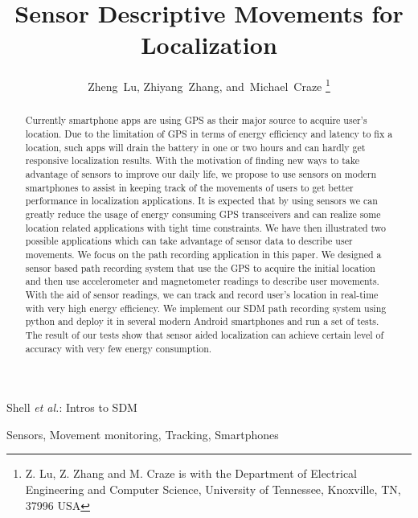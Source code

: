 \documentclass[journal]{IEEEtran}
\begin{document}
\title{Sensor Descriptive Movements for Localization}

\author{Zheng~Lu,
        Zhiyang~Zhang,
        and~Michael~Craze
\thanks{Z. Lu, Z. Zhang and M. Craze is with the Department
of Electrical Engineering and Computer Science, University of Tennessee, Knoxville,
TN, 37996 USA }} 

%
{Shell \MakeLowercase{\textit{et al.}}: Intros to SDM}


\maketitle

\begin{abstract}
Currently smartphone apps are using GPS as their major source to acquire user's location. 
Due to the limitation of GPS in terms of energy efficiency and latency to fix a location, such apps will drain the battery in one or two hours and can hardly get responsive localization results. 
With the motivation of finding new ways to take advantage of sensors to improve our daily life, we propose to use sensors on modern smartphones to assist in keeping track of the movements of users to get better performance in localization applications. 
It is expected that by using sensors we can greatly reduce the usage of energy consuming GPS transceivers and can realize some location related applications with tight time constraints. 
We have then illustrated two possible applications which can take advantage of sensor data to describe user movements.
We focus on the path recording application in this paper.
We designed a sensor based path recording system that use the GPS to acquire the initial location and then use accelerometer and magnetometer readings to describe user movements.
With the aid of sensor readings, we can track and record user's location in real-time with very high energy efficiency.
We implement our SDM path recording system using python and deploy it in several modern Android smartphones and run a set of tests.
The result of our tests show that sensor aided localization can achieve certain level of accuracy with very few energy consumption.
\end{abstract}

\begin{IEEEkeywords}
Sensors, Movement monitoring, Tracking, Smartphones
\end{IEEEkeywords}
\end{document}
